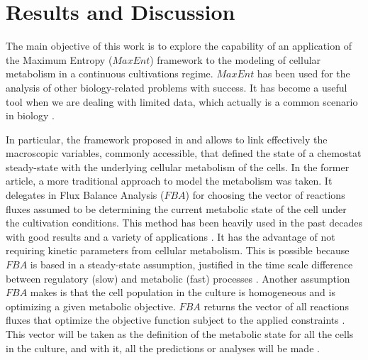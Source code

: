 \documentclass[]{article}
\begin{document}
	
	
	\newpage
	\section{Results and Discussion} 
	
	The main objective of this work is to explore the capability of an application of the Maximum Entropy ($MaxEnt$) framework to the modeling of cellular metabolism in a continuous cultivations regime. 
	$MaxEnt$ has been used for the analysis of other biology-related problems with success. 
	It has become a useful tool when we are dealing with limited data, which actually is a common scenario in biology . 
	
	In particular, the framework proposed in  and  allows to link effectively the macroscopic variables, commonly accessible, that defined the state of a chemostat steady-state with the underlying cellular metabolism of the cells. 
	In the former article, a more traditional approach to model the metabolism was taken. It delegates in Flux Balance Analysis ($FBA$)  for choosing the vector of reactions fluxes assumed to be determining the current metabolic state of the cell under the cultivation conditions. This method has been heavily used in the past decades with good results and a variety of applications . 
	It has the advantage of not requiring kinetic parameters from cellular metabolism.
	This is possible because $FBA$ is based in a steady-state assumption, justified in the time scale difference between regulatory (slow) and metabolic (fast) processes . 
	Another assumption $FBA$ makes is that the cell population in the culture is homogeneous and is optimizing a given metabolic objective.
	$FBA$ returns the vector of all reactions fluxes that optimize the objective function subject to the applied constraints . 
	This vector will be taken as the definition of the metabolic state for all the cells in the culture, and with it, all the predictions or analyses will be made . 
	
\end{document}
